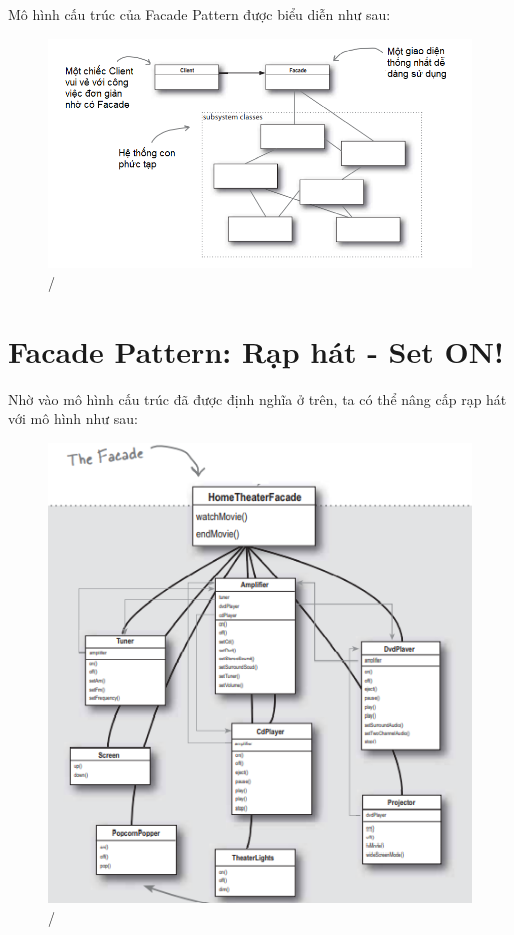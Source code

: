 Mô hình cấu trúc của Facade Pattern được biểu diễn như sau:
\begin{figure}[!htb]
    \centering
    \includegraphics[width=\textwidth]{fig/Facade/FacadeDiagram.png}/
\end{figure}
\newpage
\section{Facade Pattern: Rạp hát - Set ON!}

Nhờ vào mô hình cấu trúc đã được định nghĩa ở trên, ta có thể nâng cấp rạp hát với mô hình như sau:
\begin{figure}[!htb]
    \centering
    \includegraphics[width=\textwidth]{fig/Facade/TheaterFacade.png}/
\end{figure}

